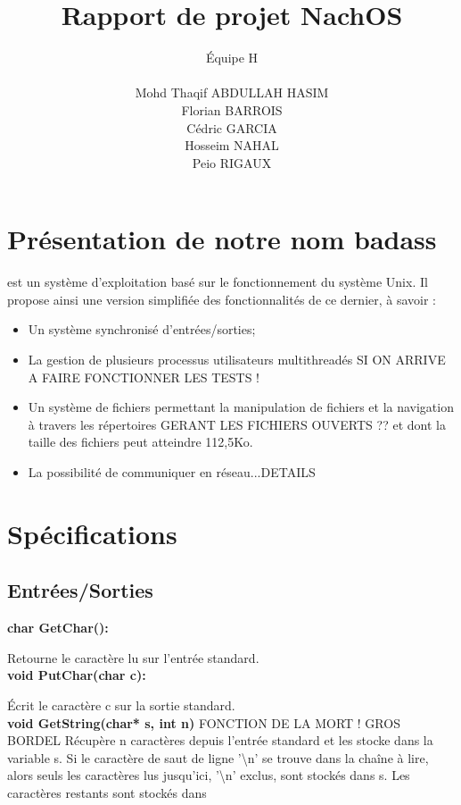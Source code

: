 \documentclass[12pt]{report}
\title{Rapport de projet NachOS}
\author{
\'Equipe H\\\\
Mohd Thaqif ABDULLAH HASIM\\
Florian BARROIS\\
Cédric GARCIA\\
Hosseim NAHAL\\
Peio RIGAUX\\
}
\begin{document}
\maketitle


\chapter{Présentation de \color{red}notre nom badass\color{black}}

est un système d'exploitation basé sur le fonctionnement du système Unix. Il propose ainsi une version simplifiée des fonctionnalités de ce dernier, à savoir :
\begin{itemize}%
\item Un système synchronisé d'entrées/sorties;
\item La gestion de plusieurs processus utilisateurs multithreadés \color{red}SI ON ARRIVE A FAIRE FONCTIONNER LES TESTS !\color{black}
\item Un système de fichiers permettant la manipulation de fichiers et la navigation à travers les répertoires \color{red}GERANT LES FICHIERS OUVERTS ??\color{black} et dont la taille des fichiers peut atteindre 112,5Ko.
\item La possibilité de communiquer en réseau...\color{red}DETAILS\color{black}

\end{itemize}


\chapter{Spécifications}
\section{Entrées/Sorties}

\textbf{char GetChar():}

Retourne le caractère lu sur l'entrée standard.\\


\textbf{void PutChar(char c):}

Écrit le caractère c sur la sortie standard.\\


\textbf{void GetString(char* s, int n)}
\color{red} FONCTION DE LA MORT ! GROS BORDEL
Récupère n caractères depuis l'entrée standard et les stocke dans la  variable s. Si le caractère de saut de ligne '\textbackslash n' se trouve dans la chaîne à lire, alors seuls les caractères lus jusqu'ici, '\textbackslash n' exclus, sont stockés dans s. Les caractères restants sont stockés dans \color{black}
\end{document}
